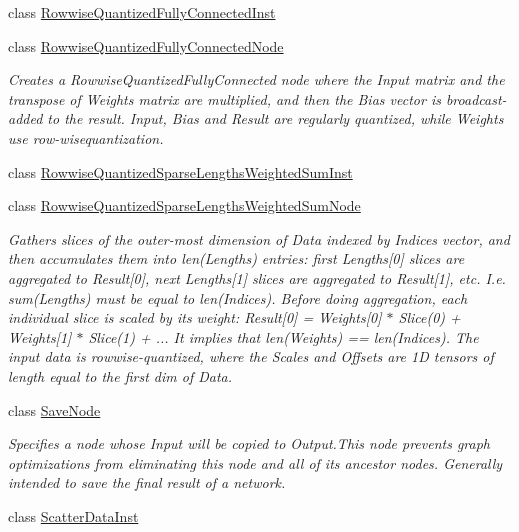 \begin{DoxyCompactItemize}
class \hyperlink{classglow_1_1_rowwise_quantized_fully_connected_inst}{Rowwise\+Quantized\+Fully\+Connected\+Inst}
\item 
class \hyperlink{classglow_1_1_rowwise_quantized_fully_connected_node}{Rowwise\+Quantized\+Fully\+Connected\+Node}
\begin{DoxyCompactList}\small\item\em Creates a Rowwise\+Quantized\+Fully\+Connected node where the Input matrix and the transpose of Weights matrix are multiplied, and then the Bias vector is broadcast-\/added to the result. Input, Bias and Result are regularly quantized, while Weights use row-\/wisequantization. \end{DoxyCompactList}\item 
class \hyperlink{classglow_1_1_rowwise_quantized_sparse_lengths_weighted_sum_inst}{Rowwise\+Quantized\+Sparse\+Lengths\+Weighted\+Sum\+Inst}
\item 
class \hyperlink{classglow_1_1_rowwise_quantized_sparse_lengths_weighted_sum_node}{Rowwise\+Quantized\+Sparse\+Lengths\+Weighted\+Sum\+Node}
\begin{DoxyCompactList}\small\item\em Gathers slices of the outer-\/most dimension of Data indexed by Indices vector, and then accumulates them into len(\+Lengths) entries\+: first Lengths\mbox{[}0\mbox{]} slices are aggregated to Result\mbox{[}0\mbox{]}, next Lengths\mbox{[}1\mbox{]} slices are aggregated to Result\mbox{[}1\mbox{]}, etc. I.\+e. sum(\+Lengths) must be equal to len(\+Indices). Before doing aggregation, each individual slice is scaled by its weight\+: Result\mbox{[}0\mbox{]} = Weights\mbox{[}0\mbox{]} $\ast$ Slice(0) + Weights\mbox{[}1\mbox{]} $\ast$ Slice(1) + ... It implies that len(\+Weights) == len(\+Indices). The input data is rowwise-\/quantized, where the Scales and Offsets are 1D tensors of length equal to the first dim of Data. \end{DoxyCompactList}\item 
class \hyperlink{classglow_1_1_save_node}{Save\+Node}
\begin{DoxyCompactList}\small\item\em Specifies a node whose Input will be copied to Output.\+This node prevents graph optimizations from eliminating this node and all of its ancestor nodes. Generally intended to save the final result of a network. \end{DoxyCompactList}\item 
class \hyperlink{classglow_1_1_scatter_data_inst}{Scatter\+Data\+Inst}

\end{DoxyCompactItemize}
